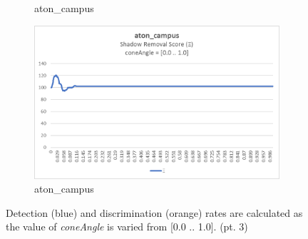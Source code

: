 \begin{appendices}
\begin{figure}
\begin{subfigure}{.45\linewidth}
  \caption{aton\_campus}
\end{subfigure}
\hfill
\begin{subfigure}{.45\linewidth}
  \includegraphics[width=1\linewidth]{figures/appendix/campus_coneAngle_score.jpg}
  \caption{aton\_campus}
\end{subfigure}

\caption{Detection (blue) and discrimination (orange) rates are calculated as the value of \textit{coneAngle} is varied from [0.0 .. 1.0]. (pt. 3)}
\end{figure}


\end{appendices}
